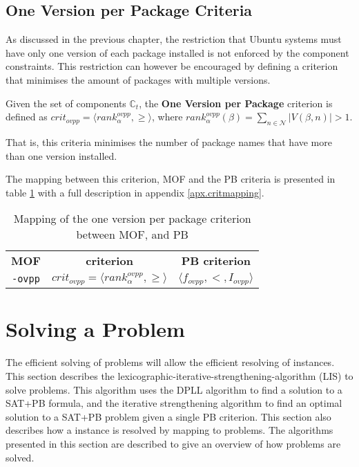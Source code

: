 \subsection{One Version per Package Criteria}
\label{impl.ipp}
As discussed in the previous chapter, the restriction that Ubuntu systems must have only one version of each package installed is not enforced by the component constraints.
This restriction can however be encouraged by defining a criterion that minimises the amount of packages with multiple versions.

\begin{defs}
	Given the set of components $\mathbb{C}_t$, the \textbf{One Version per Package} criterion is defined as $crit_{ovpp} = \langle rank^{ovpp}_{\alpha}, \geq \rangle$,
	where $rank^{ovpp}_{\alpha}(\beta) = \sum_{n \in \mathcal{N}} |V(\beta,n)| > 1$.
\end{defs}
That is, this criteria minimises the number of package names that have more than one version installed.

The mapping between this criterion, MOF and the PB criteria is presented in table \ref{impl.mcritmapping} with a full description in appendix \ref{apx.critmapping}.
\begin{table}[h!]
\centering
\begin{tabular}{c | c | c}
\textbf{MOF} 		& \textbf{\modelname criterion} & \textbf{PB criterion} \\
\texttt{-ovpp} 	& $crit_{ovpp} = \langle rank^{ovpp}_{\alpha}, \geq \rangle$ & $\langle f_{ovpp}, <, I_{ovpp} \rangle$ \\
\end{tabular}
\caption{Mapping of the one version per package criterion between MOF, \modelname and PB}
\label{impl.mcritmapping}
\end{table}

\section{Solving a \modelimpl Problem}
\label{impl.algorithms}
The efficient solving of \modelimpl problems will allow the efficient resolving of \modelname instances.
This section describes the lexicographic-iterative-strengthening-algorithm (LIS) to solve \modelimpl problems.
This algorithm uses the DPLL algorithm \citep{Davis1960, davis1962machine} to find a solution to a SAT+PB formula,
and the iterative strengthening algorithm \citep{calistri1994iterative, le2010sat4j} to find an optimal solution to a SAT+PB problem given a single PB criterion.
This section also describes how a \modelname instance is resolved by mapping to \modelimpl problems.
The algorithms presented in this section are described to give an overview of how \modelimpl problems are solved.

